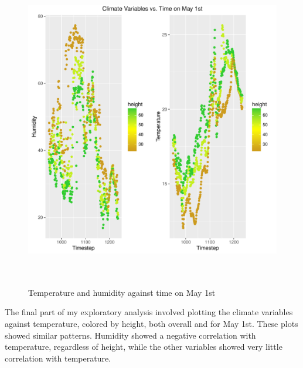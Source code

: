 \documentclass[11pt]{article}
\begin{document}
\begin{figure}
  \centering
    \includegraphics[width=\textwidth,height=14cm]{../graphs/figure3.pdf}
  \caption{Temperature and humidity against time on May 1st}
  \label{fig:find3}
\end{figure}

The final part of my exploratory analysis involved plotting the climate variables against temperature, colored by height, both overall and for May 1st. These plots showed similar patterns. Humidity showed a negative correlation with temperature, regardless of height, while the other variables showed very little correlation with temperature.  
\end{document}
